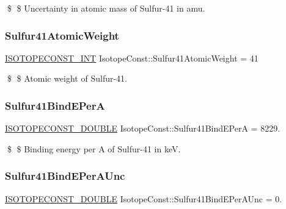 \$ \$ Uncertainty in atomic mass of Sulfur-\/41 in amu. \mbox{\label{group___isotope_const-_sulfur-_s41_ga0c117d8787394d460b2f3bfc7311d639}} 
\subsubsection{\texorpdfstring{Sulfur41\+Atomic\+Weight}{Sulfur41AtomicWeight}}
{\footnotesize\ttfamily \mbox{\hyperlink{group___isotope_const-_macros_ga5f18360b3e99483a35c32d789e62621c}{I\+S\+O\+T\+O\+P\+E\+C\+O\+N\+S\+T\+\_\+\+I\+NT}} Isotope\+Const\+::\+Sulfur41\+Atomic\+Weight = 41}

\$ \$ Atomic weight of Sulfur-\/41. \mbox{\label{group___isotope_const-_sulfur-_s41_ga3bc877c7556a06764453332d94be2fe7}} 
\subsubsection{\texorpdfstring{Sulfur41\+Bind\+E\+PerA}{Sulfur41BindEPerA}}
{\footnotesize\ttfamily \mbox{\hyperlink{group___isotope_const-_macros_ga8f45a7272ce02c0b4c65c44636ed719a}{I\+S\+O\+T\+O\+P\+E\+C\+O\+N\+S\+T\+\_\+\+D\+O\+U\+B\+LE}} Isotope\+Const\+::\+Sulfur41\+Bind\+E\+PerA = 8229.}

\$ \$ Binding energy per A of Sulfur-\/41 in keV. \mbox{\label{group___isotope_const-_sulfur-_s41_ga5e3835c09c48398e45507c51d2577642}} 
\subsubsection{\texorpdfstring{Sulfur41\+Bind\+E\+Per\+A\+Unc}{Sulfur41BindEPerAUnc}}
{\footnotesize\ttfamily \mbox{\hyperlink{group___isotope_const-_macros_ga8f45a7272ce02c0b4c65c44636ed719a}{I\+S\+O\+T\+O\+P\+E\+C\+O\+N\+S\+T\+\_\+\+D\+O\+U\+B\+LE}} Isotope\+Const\+::\+Sulfur41\+Bind\+E\+Per\+A\+Unc = 0.}


